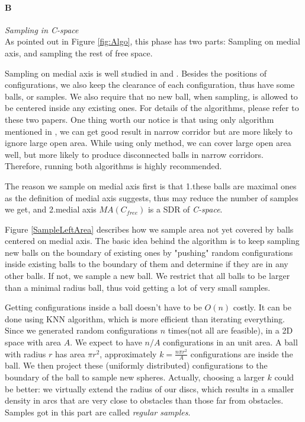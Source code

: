 \documentclass[11pt]{article}
\begin{document}
\paragraph{B} \emph{Sampling in C-space} \hfill \\
\indent As pointed out in Figure \ref{fig:Algo}, this phase has two parts: Sampling on medial axis, and sampling the rest of free space. 

\indent Sampling on medial axis is well studied in \cite{MAPRM} and \cite{UMAPRM}. Besides the positions of configurations, we also keep the clearance of each configuration, thus have some balls, or samples. We also require that no new ball, when sampling, is allowed to be centered inside any existing ones. For details of the algorithms, please refer to these two papers. One thing worth our notice is that using only algorithm mentioned in \cite{MAPRM}, we can get good result in narrow corridor but are more likely to ignore large open area. While using only \cite{UMAPRM} method, we can cover large open area well, but more likely to produce disconnected balls in narrow corridors. Therefore, running both algorithms is highly recommended. 

\indent The reason we sample on medial axis first is that 1.these balls are maximal ones as the definition of medial axis suggests, thus may reduce the number of samples we get, and 2.medial axis $MA(C_{free})$ is a SDR of \emph{C-space}. \cite{MAPRM2}

\indent Figure \ref{SampleLeftArea} describes how we sample area not yet covered by balls centered on medial axis. The basic idea behind the algorithm is to keep sampling new balls on the boundary of existing ones by "pushing" random configurations inside existing balls to the boundary of them and determine if they are in any other balls. If not, we sample a new ball. We restrict that all balls to be larger than a minimal radius ball, thus void getting a lot of very small samples.

\indent Getting configurations inside a ball doesn't have to be $O(n)$ costly. It can be done using KNN algorithm, which is more efficient than iterating everything. Since we generated random configurations $n$ times(not all are feasible), in a 2D space with area $A$. We expect to have $n/A$ configurations in an unit area. A ball with radius $r$ has area $\pi r^2$, approximately $k = \frac{n \pi r^2}{A}$ configurations are inside the ball. We then project these (uniformly distributed) configurations to the boundary of the ball to sample new spheres. Actually, choosing a larger $k$ could be better: we virtually extend the radius of our discs, which results in a smaller density in arcs that are very close to obstacles than those far from obstacles. Samples got in this part are called \emph{regular samples}. 
\end{document}
